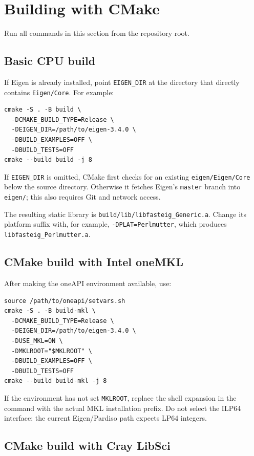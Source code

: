 \documentclass[11pt]{article}
\newcommand{\code}[1]{\texttt{#1}}
\begin{document}
\section{Building with CMake}
\label{sec:cmake}

Run all commands in this section from the repository root.

\subsection{Basic CPU build}

If Eigen is already installed, point \code{EIGEN\_DIR} at the directory that
directly contains \code{Eigen/Core}.  For example:

\begin{lstlisting}
cmake -S . -B build \
  -DCMAKE_BUILD_TYPE=Release \
  -DEIGEN_DIR=/path/to/eigen-3.4.0 \
  -DBUILD_EXAMPLES=OFF \
  -DBUILD_TESTS=OFF
cmake --build build -j 8
\end{lstlisting}

If \code{EIGEN\_DIR} is omitted, CMake first checks for an existing
\code{eigen/Eigen/Core} below the source directory.  Otherwise it fetches
Eigen's \code{master} branch into \code{eigen/}; this also requires Git and
network access.

The resulting static library is
\code{build/lib/libfasteig\_Generic.a}.  Change its platform suffix with, for
example, \code{-DPLAT=Perlmutter}, which produces
\code{libfasteig\_Perlmutter.a}.

\subsection{CMake build with Intel oneMKL}

After making the oneAPI environment available, use:

\begin{lstlisting}
source /path/to/oneapi/setvars.sh
cmake -S . -B build-mkl \
  -DCMAKE_BUILD_TYPE=Release \
  -DEIGEN_DIR=/path/to/eigen-3.4.0 \
  -DUSE_MKL=ON \
  -DMKLROOT="$MKLROOT" \
  -DBUILD_EXAMPLES=OFF \
  -DBUILD_TESTS=OFF
cmake --build build-mkl -j 8
\end{lstlisting}

If the environment has not set \code{MKLROOT}, replace the shell expansion in
the command with the actual MKL installation prefix.  Do not select the ILP64
interface: the current Eigen/Pardiso path expects LP64 integers.

\subsection{CMake build with Cray LibSci}
\end{document}
